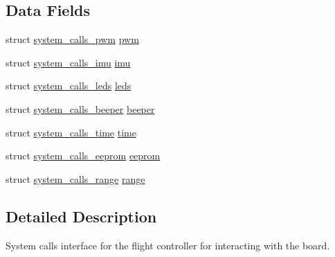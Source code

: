 \subsection*{Data Fields}
\begin{DoxyCompactItemize}
\item 
struct \hyperlink{structsystem__calls__pwm}{system\+\_\+calls\+\_\+pwm} \hyperlink{structsystem__calls_a456d662f1dbaa4230d019172ebe7abce}{pwm}
\item 
struct \hyperlink{structsystem__calls__imu}{system\+\_\+calls\+\_\+imu} \hyperlink{structsystem__calls_a4490cb0eaa873cba708463e22663ea6a}{imu}
\item 
struct \hyperlink{structsystem__calls__leds}{system\+\_\+calls\+\_\+leds} \hyperlink{structsystem__calls_af053d7e0b93ca5f53cc70c7706cdf32e}{leds}
\item 
struct \hyperlink{structsystem__calls__beeper}{system\+\_\+calls\+\_\+beeper} \hyperlink{structsystem__calls_a108f8087c3772e175668406c0e3e1ec3}{beeper}
\item 
struct \hyperlink{structsystem__calls__time}{system\+\_\+calls\+\_\+time} \hyperlink{structsystem__calls_a3bc59e7459aa9547c7697ca289826c14}{time}
\item 
struct \hyperlink{structsystem__calls__eeprom}{system\+\_\+calls\+\_\+eeprom} \hyperlink{structsystem__calls_af476786414333a8f426f53466baa6442}{eeprom}
\item 
struct \hyperlink{structsystem__calls__range}{system\+\_\+calls\+\_\+range} \hyperlink{structsystem__calls_a0f07464a12c782c790e1eb9556e861b8}{range}
\end{DoxyCompactItemize}


\subsection{Detailed Description}
System calls interface for the flight controller for interacting with the board. 

